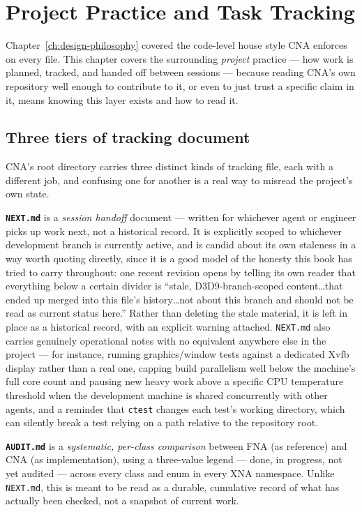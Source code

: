 \chapter{Project Practice and Task Tracking}
\label{ch:project-practice}

Chapter~\ref{ch:design-philosophy} covered the code-level house style CNA
enforces on every file. This chapter covers the surrounding \emph{project} practice --- how
work is planned, tracked, and handed off between sessions --- because reading CNA's own
repository well enough to contribute to it, or even to just trust a specific claim in it,
means knowing this layer exists and how to read it.

\section{Three tiers of tracking document}

CNA's root directory carries three distinct kinds of tracking file, each with a different job,
and confusing one for another is a real way to misread the project's own state.

\textbf{\texttt{NEXT.md}} is a \emph{session handoff} document --- written for whichever
agent or engineer picks up work next, not a historical record. It is explicitly scoped to
whichever development branch is currently active, and is candid about its own staleness in a
way worth quoting directly, since it is a good model of the honesty this book has tried to
carry throughout: one recent revision opens by telling its own reader that everything below a
certain divider is ``stale, D3D9-branch-scoped content\ldots that ended up merged into this
file's history\ldots not about this branch and should not be read as current status here.''
Rather than deleting the stale material, it is left in place as a historical record, with an
explicit warning attached. \texttt{NEXT.md} also carries genuinely operational notes with no
equivalent anywhere else in the project --- for instance, running graphics/window tests
against a dedicated Xvfb display rather than a real one, capping build parallelism well below
the machine's full core count and pausing new heavy work above a specific CPU temperature
threshold when the development machine is shared concurrently with other agents, and a
reminder that \texttt{ctest} changes each test's working directory, which can silently break a
test relying on a path relative to the repository root.

\textbf{\texttt{AUDIT.md}} is a \emph{systematic, per-class comparison} between FNA (as
reference) and CNA (as implementation), using a three-value legend --- done, in progress, not
yet audited --- across every class and enum in every XNA namespace. Unlike \texttt{NEXT.md},
this is meant to be read as a durable, cumulative record of what has actually been checked,
not a snapshot of current work.

